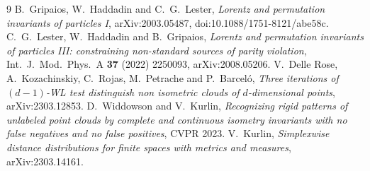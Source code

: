 \documentclass[11pt]{article}
\theoremstyle{definition}
\theoremstyle{remark}
\begin{document}
\begin{thebibliography}{9}
 B.~Gripaios, W.~Haddadin and C.~G.~Lester, \emph{Lorentz and
  permutation invariants of particles I}, arXiv:2003.05487,
  doi:10.1088/1751-8121/abe58c.
 C.~G.~Lester, W.~Haddadin and B.~Gripaios, \emph{Lorentz and
  permutation invariants of particles III: constraining non-standard sources of
  parity violation}, Int.\ J.\ Mod.\ Phys.\ A \textbf{37} (2022) 2250093,
  arXiv:2008.05206.
 V.~Delle Rose, A.~Kozachinskiy, C.~Rojas, M.~Petrache and
  P.~Barcel\'o, \emph{Three iterations of $(d-1)$-WL test distinguish non
  isometric clouds of $d$-dimensional points}, arXiv:2303.12853.
 D.~Widdowson and V.~Kurlin, \emph{Recognizing rigid patterns of
  unlabeled point clouds by complete and continuous isometry invariants with no
  false negatives and no false positives}, CVPR 2023.
 V.~Kurlin, \emph{Simplexwise distance distributions for finite
  spaces with metrics and measures}, arXiv:2303.14161.
\end{thebibliography}
\end{document}
